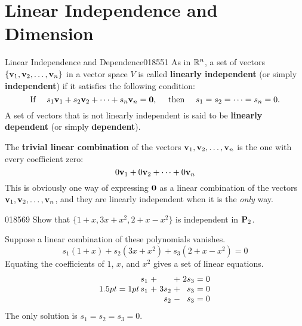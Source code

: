 \section{Linear Independence and Dimension}
\label{sec:6_3}

\begin{definition}{Linear Independence and Dependence}{018551}
As in $\mathbb{R}^n$, a set of vectors $\{\textbf{v}_{1}, \textbf{v}_{2}, \dots, \textbf{v}_{n}\}$ in a vector space $V$ is called \textbf{linearly independent} (or simply \textbf{independent}) if it satisfies the following condition:
\begin{equation*}
\mbox{If } \quad s_1\textbf{v}_1 + s_2\textbf{v}_2 + \dots + s_n\textbf{v}_n = \textbf{0}, \quad \mbox{ then } \quad 
s_1 = s_2 = \dots = s_n = 0.
\end{equation*}
A set of vectors that is not linearly independent is said to be \textbf{linearly dependent} (or simply \textbf{dependent}).
\end{definition}

\noindent The \textbf{trivial linear combination} of the vectors $\textbf{v}_{1}, \textbf{v}_{2}, \dots, \textbf{v}_{n}$ is the one with every coefficient zero:
\begin{equation*}
0\textbf{v}_1 + 0\textbf{v}_2 + \dots + 0\textbf{v}_n
\end{equation*}
This is obviously one way of expressing $\textbf{0}$ as a linear combination of the vectors $\textbf{v}_{1}, \textbf{v}_{2}, \dots, \textbf{v}_{n}$, and they are linearly independent when it is the \textit{only} way.

\begin{example}{}{018569}
Show that $\{1 + x, 3x + x^{2}, 2 + x - x^{2}\}$ is independent in $\textbf{P}_{2}$.

\begin{solution}
Suppose a linear combination of these polynomials vanishes.
\begin{equation*}
s_1(1 + x) + s_2(3x + x^2) + s_3(2 + x - x^2) = 0
\end{equation*}
Equating the coefficients of $1$, $x$, and $x^{2}$ gives a set of linear equations.
\begin{equation*}
\arraycolsep=1pt
\begin{array}{rlrlrcr}
	s_1 & + &      & + & 2s_3 & = & 0 \\
	s_1 & + & 3s_2 & + &  s_3 & = & 0 \\
	    &   &  s_2 & - &  s_3 & = & 0 \\
\end{array}
\end{equation*}
The only solution is $s_{1} = s_{2} = s_{3} = 0$.
\end{solution}
\end{example}

